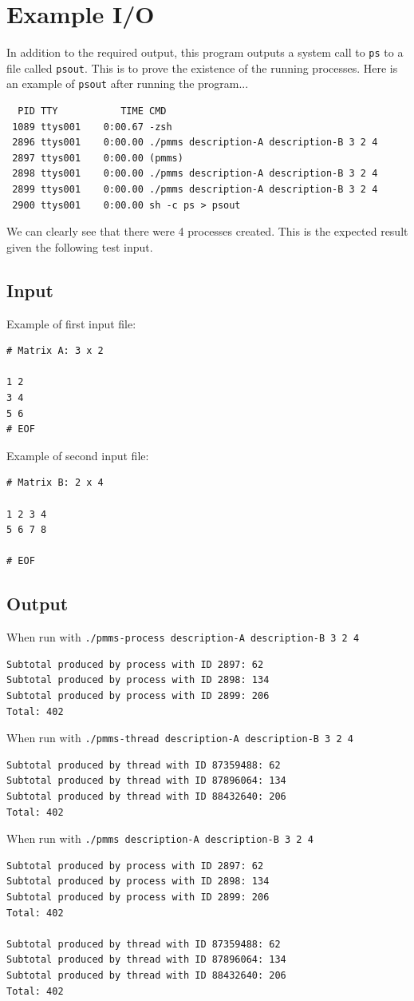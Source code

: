 \documentclass[titlepage]{article}
\begin{document}
\section{Example I/O}
In addition to the required output, this program outputs a system call to 
\texttt{ps} to a file called \texttt{psout}. This is to prove the existence of
the running processes. Here is an example of  \texttt{psout} after running the 
program...
\begin{lstlisting}
  PID TTY           TIME CMD
 1089 ttys001    0:00.67 -zsh
 2896 ttys001    0:00.00 ./pmms description-A description-B 3 2 4
 2897 ttys001    0:00.00 (pmms)
 2898 ttys001    0:00.00 ./pmms description-A description-B 3 2 4
 2899 ttys001    0:00.00 ./pmms description-A description-B 3 2 4
 2900 ttys001    0:00.00 sh -c ps > psout
\end{lstlisting}

We can clearly see that there were 4 processes created. This is the expected 
result given the following test input.

\subsection{Input}
Example of first input file:
\begin{lstlisting}
# Matrix A: 3 x 2

1 2
3 4
5 6
# EOF
\end{lstlisting}

Example of second input file:
\begin{lstlisting}
# Matrix B: 2 x 4

1 2 3 4
5 6 7 8

# EOF
\end{lstlisting}
\subsection{Output}
When run with \texttt{./pmms-process description-A description-B 3 2 4}
\begin{lstlisting}
Subtotal produced by process with ID 2897: 62
Subtotal produced by process with ID 2898: 134
Subtotal produced by process with ID 2899: 206
Total: 402
\end{lstlisting}
When run with \texttt{./pmms-thread description-A description-B 3 2 4}
\begin{lstlisting}
Subtotal produced by thread with ID 87359488: 62
Subtotal produced by thread with ID 87896064: 134
Subtotal produced by thread with ID 88432640: 206
Total: 402
\end{lstlisting}
When run with \texttt{./pmms description-A description-B 3 2 4}
\begin{lstlisting}
Subtotal produced by process with ID 2897: 62
Subtotal produced by process with ID 2898: 134
Subtotal produced by process with ID 2899: 206
Total: 402

Subtotal produced by thread with ID 87359488: 62
Subtotal produced by thread with ID 87896064: 134
Subtotal produced by thread with ID 88432640: 206
Total: 402
\end{lstlisting}
\end{document}
